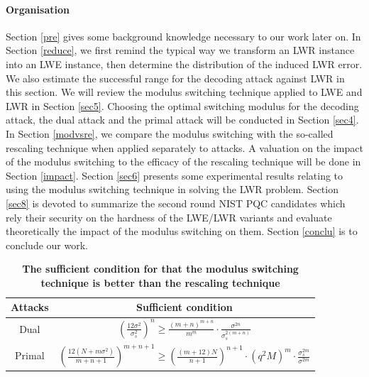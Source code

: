 \documentclass{cta-author}
\begin{document}
\paragraph{Organisation}  Section \ref{pre} gives some background knowledge necessary to our work later on. In Section \ref{reduce}, we first remind the typical way we transform an LWR instance into an LWE instance, then determine the distribution of the induced LWR error. We also estimate the successful range for the decoding attack against LWR in this section.  We will review the modulus switching technique applied to LWE and LWR in Section \ref{sec5}. Choosing the optimal switching modulus for the decoding attack, the dual attack and the primal attack will be conducted in Section \ref{sec4}. In Section \ref{modvsre}, we compare the modulus switching with the so-called rescaling technique when applied separately to attacks. A valuation on the impact of the modulus switching to the efficacy of the rescaling technique will be done in Section \ref{impact}. Section \ref{sec6} presents some experimental results relating to using the modulus switching technique in solving the LWR problem. Section \ref{sec8} is devoted to summarize the second round NIST PQC candidates which rely their security on the hardness of the LWE/LWR variants and evaluate theoretically the impact of the modulus switching on them. Section \ref{conclu} is to conclude our work. 




\begin{table}[t]
	\small\addtolength{\tabcolsep}{20pt}
	\caption{\textbf{The sufficient condition for that the modulus switching technique is better than the rescaling technique}} 
	\centering
	\small
	\begin{tabular}{c c  }
		\hline
		\textbf{Attacks}& \textbf{Sufficient condition}\\
		\hline\hline
		
		\multirow{2}{*}{Dual}&\multirow{2}{*}{$ \left(\frac{12\sigma^2}{\sigma_s^2}\right)^{n} \geq\frac{(m+n)^{m+n}}{m^{m}}\cdot \frac{\sigma^{2n}}{\sigma_s^{2(m+n)}}$}\\
		&\\
		
		\hline
		\multirow{2}{*}{Primal}  &\multirow{2}{*}{$ \left(\frac{12(N+m\sigma^2)}{m+n+1}\right)^{m+n+1} \geq \left( \frac{(m+12)N}{n+1}\right)^{n+1} \cdot \left( q^{2} M \right)^{m} \cdot \frac{\sigma_s^{2m}}{\sigma^{2m}} $}\\
		&\\
		\hline
	\end{tabular}\label{tab4}
\end{table}
\end{document}
